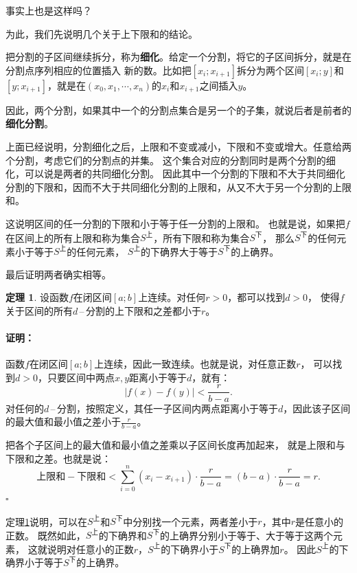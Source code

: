 \documentclass[12pt,UTF8]{ctexbook}
\theoremstyle{definition}
\newtheorem{tm}{定理}[section]
\theoremstyle{plain}
\renewenvironment{proof}{\paragraph{\textbf{证明：}}}{\hfill$\square$}
\begin{document}
\begin{appendix}
事实上也是这样吗？

为此，我们先说明几个关于上下限和的结论。

把分割的子区间继续拆分，称为\textbf{细化}。给定一个分割，将它的子区间拆分，就是在分割点序列相应的位置插入
新的数。比如把$[x_i; x_{i+1}]$拆分为两个区间$[x_i; y]$和$[y; x_{i+1}]$，就是在$(x_0, x_1, \cdots, x_n)$的$x_i$和$x_{i+1}$之间插入$y$。

因此，两个分割，如果其中一个的分割点集合是另一个的子集，就说后者是前者的\textbf{细化分割}。

上面已经说明，分割细化之后，上限和不变或减小，下限和不变或增大。任意给两个分割，考虑它们的分割点的并集。
这个集合对应的分割同时是两个分割的细化，可以说是两者的共同细化分割。
因此其中一个分割的下限和不大于共同细化分割的下限和，因而不大于共同细化分割的上限和，从又不大于另一个分割的上限和。

这说明区间的任一分割的下限和小于等于任一分割的上限和。
也就是说，如果把$f$在区间上的所有上限和称为集合$S^{\text{上}}$，所有下限和称为集合$S^{\text{下}}$，
那么$S^{\text{下}}$的任何元素小于等于$S^{\text{上}}$的任何元素，
$S^{\text{上}}$的下确界大于等于$S^{\text{下}}$的上确界。

最后证明两者确实相等。

\begin{tm}\label{tm:c-1-10}
    设函数$f$在闭区间$[a; b]$上连续。对任何$r>0$，都可以找到$d>0$，
    使得$f$关于区间的所有$d$\,–\,分割的上下限和之差都小于$r$。
\end{tm}

\begin{proof}
    函数$f$在闭区间$[a; b]$上连续，因此一致连续。也就是说，对任意正数$r$，
    可以找到$d>0$，只要区间中两点$x,y$距离小于等于$d$，就有：
    $$ |f(x) - f(y)| < \frac{r}{b - a}. $$
    对任何的$d$\,–\,分割，按照定义，其任一子区间内两点距离小于等于$d$，因此该子区间的最大值和最小值之差小于$\frac{r}{b - a}$。
    
    把各个子区间上的最大值和最小值之差乘以子区间长度再加起来，
    就是上限和与下限和之差。也就是说：
    $$ \mbox{上限和} - \mbox{下限和} < \sum_{i=0}^n (x_i - x_{i+1}) \cdot \frac{r}{b - a} = (b - a) \cdot \frac{r}{b - a} = r.$$
\end{proof}

定理\ref{tm:c-1-10}说明，可以在$S^{\text{上}}$和$S^{\text{下}}$中分别找一个元素，两者差小于$r$，其中$r$是任意小的正数。
既然如此，$S^{\text{上}}$的下确界和$S^{\text{下}}$的上确界分别小于等于、大于等于这两个元素，
这就说明对任意小的正数$r$，$S^{\text{上}}$的下确界小于$S^{\text{下}}$的上确界加$r$。
因此$S^{\text{上}}$的下确界小于等于$S^{\text{下}}$的上确界。


\end{appendix}
\end{document}
